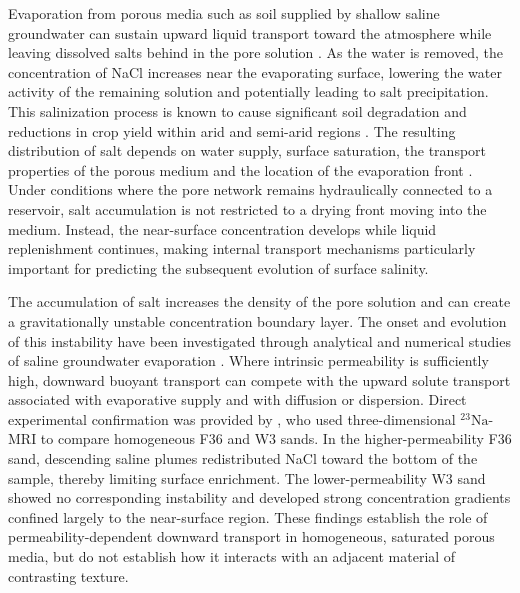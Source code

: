 \documentclass[final]{agujournal2019}
\newcommand{\NaIso}{\ensuremath{^{23}\mathrm{Na}}}
\begin{document}
Evaporation from porous media such as soil supplied by shallow saline
groundwater can sustain upward liquid transport toward the atmosphere while
leaving dissolved salts behind in the pore solution
\cite{nachshon2011a,shokrikuehni2020}. As the water is removed, the
concentration of NaCl increases near the evaporating surface, lowering the water
activity of the remaining solution and potentially leading to salt
precipitation. This salinization process is known to cause significant soil
degradation and reductions in crop yield within arid and semi-arid regions
\cite{rodriguez1997,chaves2009}. The resulting distribution of salt depends on
water supply, surface saturation, the transport properties of the porous medium
and the location of the evaporation front
\cite{shimojima1996,nachshon2011b,shokrikuehni2020}. Under conditions where the
pore network remains hydraulically connected to a reservoir, salt accumulation
is not restricted to a drying front moving into the medium. Instead, the
near-surface concentration develops while liquid replenishment continues, making
internal transport mechanisms particularly important for predicting the
subsequent evolution of surface salinity.

The accumulation of salt increases the density of the pore solution and can
create a gravitationally unstable concentration boundary layer. The onset and
evolution of this instability have been investigated through analytical and
numerical studies of saline groundwater evaporation
\cite{wooding1997a,wooding1997b,bringedal2022}. Where intrinsic permeability is
sufficiently high, downward buoyant transport can compete with the upward solute
transport associated with evaporative supply and with diffusion or dispersion.
Direct experimental confirmation was provided by , who used
three-dimensional \NaIso-MRI to compare homogeneous F36 and W3 sands. In the
higher-permeability F36 sand, descending saline plumes redistributed NaCl toward
the bottom of the sample, thereby limiting surface enrichment. The
lower-permeability W3 sand showed no corresponding instability and developed
strong concentration gradients confined largely to the near-surface region.
These findings establish the role of permeability-dependent downward transport in
homogeneous, saturated porous media, but do not establish how it interacts with
an adjacent material of contrasting texture.
\end{document}
